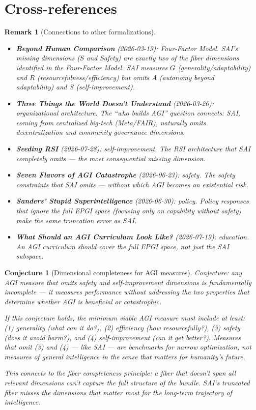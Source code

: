 \documentclass[11pt,a4paper]{article}
\newtheorem{conjecture}[definition]{Conjecture}
\newtheorem{remark}[definition]{Remark}
\begin{document}
\section{Cross-references}

\begin{remark}[Connections to other formalizations]
\begin{itemize}
\item \textbf{Beyond Human Comparison} (2026-03-19): Four-Factor Model.
  SAI's missing dimensions ($S$ and Safety) are exactly two of the
  fiber dimensions identified in the Four-Factor Model. SAI measures
  $G$ (generality/adaptability) and $R$ (resourcefulness/efficiency)
  but omits $A$ (autonomy beyond adaptability) and $S$
  (self-improvement).
\item \textbf{Three Things the World Doesn't Understand} (2026-03-26):
  organizational architecture. The ``who builds AGI'' question connects:
  SAI, coming from centralized big-tech (Meta/FAIR), naturally omits
  decentralization and community governance dimensions.
\item \textbf{Seeding RSI} (2026-07-28): self-improvement. The RSI
  architecture that SAI completely omits --- the most consequential
  missing dimension.
\item \textbf{Seven Flavors of AGI Catastrophe} (2026-06-23): safety.
  The safety constraints that SAI omits --- without which AGI becomes
  an existential risk.
\item \textbf{Sanders' Stupid Superintelligence} (2026-06-30): policy.
  Policy responses that ignore the full EPGI space (focusing only on
  capability without safety) make the same truncation error as SAI.
\item \textbf{What Should an AGI Curriculum Look Like?} (2026-07-19):
  education. An AGI curriculum should cover the full EPGI space, not
  just the SAI subspace.
\end{itemize}
\end{remark}

\begin{conjecture}[Dimensional completeness for AGI measures]
Conjecture: any AGI measure that omits safety and self-improvement
dimensions is fundamentally incomplete --- it measures performance
without addressing the two properties that determine whether AGI is
beneficial or catastrophic.

If this conjecture holds, the minimum viable AGI measure must include
at least: (1) generality (what can it do?), (2) efficiency (how
resourcefully?), (3) safety (does it avoid harm?), and (4)
self-improvement (can it get better?). Measures that omit (3) and (4)
--- like SAI --- are benchmarks for narrow optimization, not measures
of general intelligence in the sense that matters for humanity's future.

This connects to the fiber completeness principle: a fiber that doesn't
span all relevant dimensions can't capture the full structure of the
bundle. SAI's truncated fiber misses the dimensions that matter most
for the long-term trajectory of intelligence.
\end{conjecture}
\end{document}
